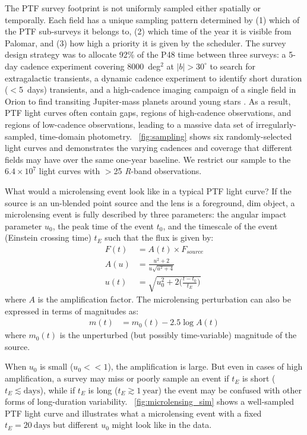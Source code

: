 \documentclass[12pt,preprint]{aastex}
\newcommand{\apwsim}{\raisebox{0.2ex}{\scriptsize$\sim$\normalsize}}
\begin{document}
The PTF survey footprint is not uniformly sampled either spatially or temporally. Each field has a unique sampling pattern determined by (1) which of the PTF sub-surveys it belongs to, (2) which time of the year it is visible from Palomar, and (3) how high a priority it is given by the scheduler. The survey design strategy was to allocate 92\% of the P48 time between three surveys: a 5-day cadence experiment covering 8000~deg$^2$ at $|b|>30^\circ$ to search for extragalactic transients, a dynamic cadence experiment to identify  short duration ($<$5~days) transients, and a high-cadence imaging campaign of a single field in Orion to find transiting Jupiter-mass planets around young stars \citep{nick2009}. As a result, PTF light curves often contain gaps, regions of high-cadence observations, and regions of low-cadence observations, leading to a massive data set of irregularly-sampled, time-domain photometry. \figurename~\ref{fig:sampling} shows six randomly-selected light curves and demonstrates the varying cadences and coverage that different fields may have over the same one-year baseline. We restrict our sample to the \apwsim$6.4\times10^7$ light curves with $>$25 \textit{R}-band observations.

What would a microlensing event look like in a typical PTF light curve? If the source is an un-blended point source and the lens is a foreground, dim object, a microlensing event is fully described by three parameters: the angular impact parameter $u_0$, the peak time of the event $t_0$, and the timescale of the event (Einstein crossing time) $t_E$ such that the flux is given by:
\begin{align}
	F(t) &= A(t)\times F_{source} \\
	A(u) &= \frac{u^2 + 2}{u\sqrt{u^2 + 4}}\\
	u(t) &= \sqrt{u_0^2 + 2\Big(\frac{t-t_0}{t_E}\Big)}
\end{align}
where $A$ is the amplification factor. The microlensing perturbation can also be expressed in terms of magnitudes as:
\begin{align}
	m(t) &= m_0(t) - 2.5\log A(t)
\end{align}
where $m_0(t)$ is the unperturbed (but possibly time-variable) magnitude of the source.

When $u_0$ is small ($u_0<<1$), the amplification is large. But even in cases of high amplification, a survey may miss or poorly sample an event if $t_E$ is short ($t_E \lesssim\mathrm{days}$), while if $t_E$ is long ($t_E \gtrsim 1~\mathrm{year}$) the event may be confused with other forms of long-duration variability. \figurename~\ref{fig:microlensing_sim} shows a well-sampled PTF light curve and illustrates what a microlensing event with a fixed $t_E=20~\mathrm{days}$ but different $u_0$ might look like in the data.
\end{document}
